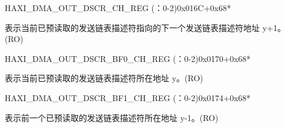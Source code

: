 \begin{register}{H}{AXI\_DMA\_OUT\_DSCR\_CH\_REG (：0-2)}{0x016C+0x68*}\label{regdesc:AXIDMAOUTDSCRCHNREG}
%
\regnewline%
\begin{regdesc}\begin{reglist}
\label{fielddesc:AXIDMAOUTLINKDSCRCHN}\item [AXI\_DMA\_OUTLINK\_DSCR\_CH\regindex{n}] 表示当前已预读取的发送链表描述符指向的下一个发送链表描述符地址 y+1。(RO)
\end{reglist}\end{regdesc}
\end{register}


\begin{register}{H}{AXI\_DMA\_OUT\_DSCR\_BF0\_CH\_REG (：0-2)}{0x0170+0x68*}\label{regdesc:AXIDMAOUTDSCRBF0CHNREG}
%
\regnewline%
\begin{regdesc}\begin{reglist}
\label{fielddesc:AXIDMAOUTLINKDSCRBF0CHN}\item [AXI\_DMA\_OUTLINK\_DSCR\_BF0\_CH\regindex{n}] 表示当前已预读取的发送链表描述符所在地址 y。(RO)
\end{reglist}\end{regdesc}
\end{register}


\begin{register}{H}{AXI\_DMA\_OUT\_DSCR\_BF1\_CH\_REG (：0-2)}{0x0174+0x68*}\label{regdesc:AXIDMAOUTDSCRBF1CHNREG}
%
\regnewline%
\begin{regdesc}\begin{reglist}
\label{fielddesc:AXIDMAOUTLINKDSCRBF1CHN}\item [AXI\_DMA\_OUTLINK\_DSCR\_BF1\_CH\regindex{n}] 表示前一个已预读取的发送链表描述符所在地址 y-1。(RO)
\end{reglist}\end{regdesc}
\end{register}


